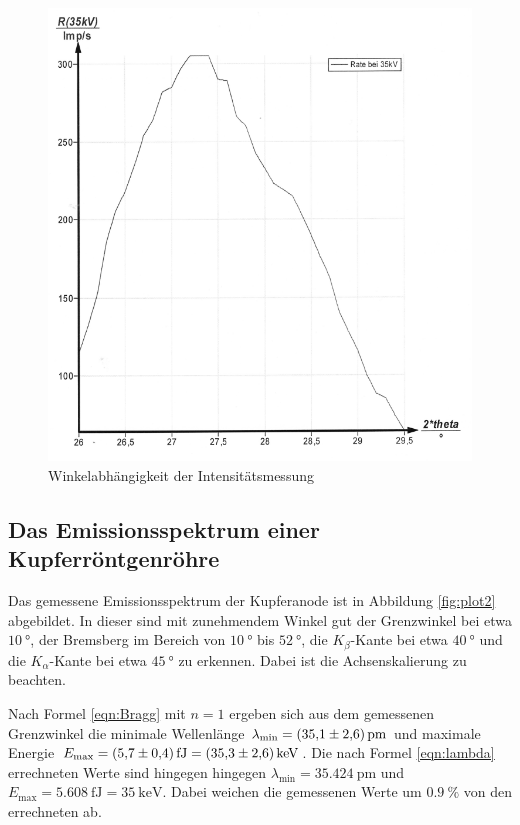 \begin{figure}[H]
  \centering
  \includegraphics[scale=0.3]{content/bild1.png}
  \caption{Winkelabhängigkeit der Intensitätsmessung}
  \label{fig:plot1}
\end{figure}

\subsection{Das Emissionsspektrum einer Kupferröntgenröhre}

Das gemessene Emissionsspektrum der Kupferanode ist in Abbildung \ref{fig:plot2} abgebildet.
In dieser sind mit zunehmendem Winkel gut der Grenzwinkel bei etwa $\SI{10}{\degree}$,
der Bremsberg im Bereich von $\SI{10}{\degree}$ bis $\SI{52}{\degree}$, die 
$K_\beta$-Kante bei etwa $\SI{40}{\degree}$ und die $K_\alpha$-Kante bei 
etwa $\SI{45}{\degree}$ zu erkennen. Dabei ist die Achsenskalierung zu beachten.

Nach Formel \eqref{eqn:Bragg} mit $n = 1$ ergeben sich aus dem gemessenen Grenzwinkel die 
minimale Wellenlänge $\lambda_\text{min} = \SI{35.1 +- 2.6}{\pico\meter}$ und maximale
Energie $E_\text{max} = \SI{5.7 +- 0.4}{\femto\joule} = \SI{35.3 +- 2.6}{\kilo\eV}$.
Die nach Formel \eqref{eqn:lambda} errechneten Werte sind hingegen hingegen
$\lambda_\text{min} = \SI{35.424}{\pico\meter}$ und 
$E_\text{max} = \SI{5.608}{\femto\joule} = \SI{35}{\kilo\eV}$.
Dabei weichen die gemessenen Werte um $\SI{0.9}{\percent}$ von den errechneten ab.

